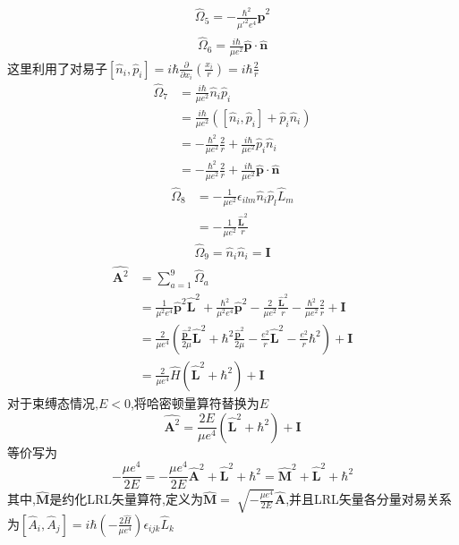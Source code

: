 {$$\begin{align}\hat{\Omega }_5=-\frac{\hbar ^2}{\mu'^2e^4}\hat{\bm{p}}^2        \end {align}$$
$$\begin{align}\hat{\Omega }_6=\frac{i\hbar }{\mu e^2}\hat{\bm{p}}\cdot  \hat{\bm{n}}         \end {align} $$
     这里利用了对易子$ \displaystyle[\hat{n}_i,\hat{p}_i]=i\hbar \frac{\partial }{\partial x_i}(\frac{x_i}{r} )=i\hbar \frac{2}{r}$
$$\begin{align}\hat{\Omega }_7&=\frac{i\hbar }{\mu e^2}\hat{n}_i\hat{p}_i  \\& =     \frac{i\hbar }{\mu e^2}([\hat{n}_i,\hat{p}_i]+\hat{p}_i\hat{n}_i)\\& =- \frac{\hbar^2 }{\mu e^2}\frac{2}{r} + \frac{i\hbar }{\mu e^2}\hat{p}_i\hat{n}_i\\& =- \frac{\hbar^2 }{\mu e^2}\frac{2}{r} + \frac{i\hbar }{\mu e^2}\hat{\bm{p}}\cdot \hat{\bm{n}}    \end {align} $$
$$\begin{align}\hat{\Omega }_8 &=-\frac{1}{\mu e^2}\epsilon _{ilm}\hat{n}_i\hat{p}_l\hat{L}_m \\& =-\frac{1}{\mu e^2}\frac{\hat{\bm{L}}^2 }{r}     \end {align} $$
$$\begin{align}\hat{\Omega }_9=\hat{n}_i \hat{n}_i=\bm{I}    \end {align} $$
    }
\begin{equation}
    \begin{align}\displaystyle \hat{\bm{A}^2} &=\sum_{a=1}^{9}\hat{\Omega }  _a \\& =\frac{1}{\mu ^2e^4}\hat{\bm{p}}^2\hat{\bm{L}}^2+\frac{\hbar ^2}{\mu ^2e^4}\hat{\bm{p}}^2-\frac{2}{\mu e^2}\frac{\hat{\bm{L}}^2}{r} - \frac{\hbar^2 }{\mu e^2}\frac{2}{r} +\bm{I} \\& =\frac{2}{\mu e^4}(\frac{\hat{\bm{p}}^2}{2\mu } \hat{\bm{L}}^2+\hbar ^2 \frac{\hat{\bm{p}}^2}{2\mu } - \frac{e^2}{r}\hat{\bm{L}}^2-\frac{e^2}{r}\hbar ^2 )+\bm{I} \\& =\frac{2}{\mu e^4}\hat{H}(\hat{\bm{L}}^2+\hbar ^2)+\bm{I} \end {align} 
\end{equation}
对于束缚态情况,$E<0$,将哈密顿量算符替换为$E$
\begin{equation}
    \displaystyle \hat{\bm{A}^2}=\frac{2E}{\mu e^4}(\hat{\bm{L}}^2+\hbar ^2)+\bm{I} 
\end{equation}
等价写为
\begin{equation}
    \displaystyle-\frac{\mu e^4}{2E}=- \frac{\mu e^4}{2E}\hat{\bm{A}}^2+ \hat{\bm{L}}^2+\hbar ^2=\hat{\bm{M}}^2+\hat{\bm{L}}^2+\hbar ^2
\end{equation}
其中,$\hat{\bm{M}} $是约化LRL矢量算符,定义为$\displaystyle\hat{\bm{M}}=\sqrt[]{-\frac{\mu e^4}{2E} }  \hat{\bm{A}}$,并且LRL矢量各分量对易关系为$\displaystyle[\hat{A}_i,\hat{A}_j ]=i\hbar (-\frac{2\hat{H} }{\mu e^4} )\epsilon _{ijk}\hat{L}_k $

